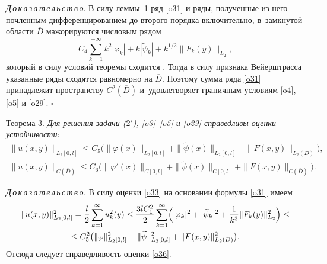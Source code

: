 \smallskip

\textit{Д\,о\,к\,а\,з\,а\,т\,е\,л\,ь\,с\,т\,в\,о}. В силу леммы~\hyperlink{sab:lemma1}{1} ряд \eqref{o31} и ряды, полученные из него почленным дифференцированием до второго порядка включительно, в~замкнутой области $\overline{D}$ мажорируются числовым рядом
$$
C_4\sum_{k=1}^{+\infty} k^2|\varphi_k|+k|\widetilde{\psi}_k|+k^{1/2}\|F_k(y)\|_{L_2},
$$
который в силу условий теоремы сходится \cite[с.~90--94]{sab:24}. 
Тогда в силу признака Вейерштрасса указанные ряды сходятся равномерно на $\overline{D}$. 
Поэтому сумма ряда \eqref{o31} принадлежит пространству $C^2(\overline{D})$ и~удовлетворяет граничным условиям \eqref{o4}, \eqref{o5} и \eqref{o29}. $\square$

\smallskip

\hypertarget{sab:th3}{}

{\small \sc Теорема 3.} \textit{Для решения задачи \em (\hyperlink{sab:(2')}{$2'$}), \eqref{o3}--\eqref{o5} \em и \em  \eqref{o29} \em справедливы оценки  устойчивости}\/:
\begin{gather}\label{o36}
\|u(x,y)\|_{L_2[0,l]}\leq C_5 
\bigl(\|\varphi(x)\|_{L_2[0,l]}+\|\widetilde{\psi}(x)\|_{L_2[0,l]}+\|F(x,y)\|_{L_2(D)}\bigr),
\\
\label{o37}
\|u(x,y)\|_{C(\overline{D})}\leq C_6\bigl(\|\varphi'(x)\|_{C[0,l]}+\|\widetilde{\psi}(x)\|_{C[0,l]}+\|F(x,y)\|_{C(\overline{D})}\bigr).
\end{gather}

\smallskip 

 
\textit{Д\,о\,к\,а\,з\,а\,т\,е\,л\,ь\,с\,т\,в\,о.} В силу оценки \eqref{o33} на основании формулы \eqref{o31} имеем
\begin{multline}
\|u(x,y)\|^2_{L_2[0,l]}=\frac{l}{2}\sum_{k=1}^{\infty} u^2_k(y)\leq 
\frac{3lC^2_1}{2}\sum_{k=1}^{\infty} 
\Bigl(|\varphi_k|^2+|\widetilde{\psi}_k|^2+\frac{1}{k^3}\|F_k(y)\|^2_{L_2}\Bigr)\leq
\\
\leq C^2_5\bigl(\|\varphi\|^2_{L_2[0,l]}+\|\widetilde{\psi}\|^2_{L_2[0,l]}+\|F(x,y)\|^2_{L_2(D)}\bigr).
\end{multline}
Отсюда следует справедливость оценки \eqref{o36}.

